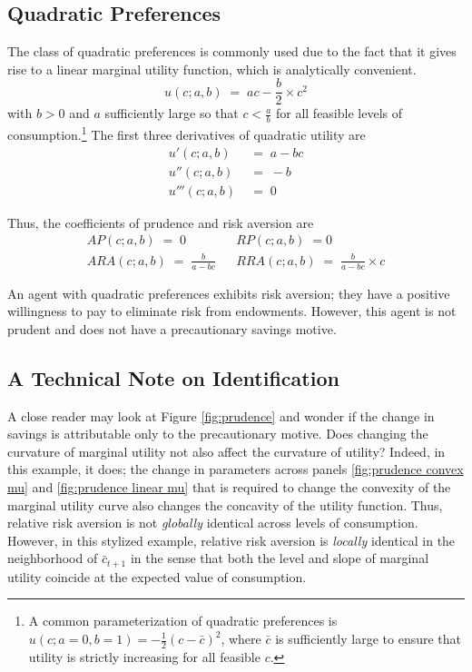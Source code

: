 \documentclass[11pt]{article}
\begin{document}
\subsection{Quadratic Preferences \label{sec:quadratic utility}}
The class of quadratic preferences is commonly used due to the fact that it gives rise to a linear marginal utility function, which is analytically convenient.
\begin{equation}
    u(c; a, b) \;=\; ac - \frac{b}{2} \times c^2
\end{equation}
with $b > 0$ and $a$ sufficiently large so that $c < \frac{a}{b}$ for all feasible levels of consumption.\footnote{A common parameterization of quadratic preferences is $u(c; a=0, b=1) = -\frac{1}{2}(c - \bar{c})^2$, where $\bar{c}$ is sufficiently large to ensure that utility is strictly increasing for all feasible $c$.} The first three derivatives of quadratic utility are
\begin{align*}
    u'(c; a,b) &\;=\; a - bc \\
    u''(c; a,b) &\;=\; -b \\
    u'''(c; a,b) &\;=\; 0
\end{align*}

Thus, the coefficients of prudence and risk aversion are
\begin{align*}
    AP(c;a,b) \;=\; 0 && RP(c;a,b) \;= 0 \\
    ARA(c;a,b) \;=\; \frac{b}{a - bc} && RRA(c;a,b) \;=\; \frac{b}{a - bc} \times c
\end{align*}

An agent with quadratic preferences exhibits risk aversion; they have a positive willingness to pay to eliminate risk from endowments. However, this agent is not prudent and does not have a precautionary savings motive.

\subsection{A Technical Note on Identification}
A close reader may look at Figure \ref{fig:prudence} and wonder if the change in savings is attributable only to the precautionary motive. Does changing the curvature of marginal utility not also affect the curvature of utility? Indeed, in this example, it does; the change in parameters across panels \ref{fig:prudence convex mu} and \ref{fig:prudence linear mu} that is required to change the convexity of the marginal utility curve also changes the concavity of the utility function. Thus, relative risk aversion is not \emph{globally} identical across levels of consumption. However, in this stylized example, relative risk aversion is \emph{locally} identical in the neighborhood of $\bar{c}_{t+1}$ in the sense that both the level and slope of marginal utility coincide at the expected value of consumption.
\end{document}
